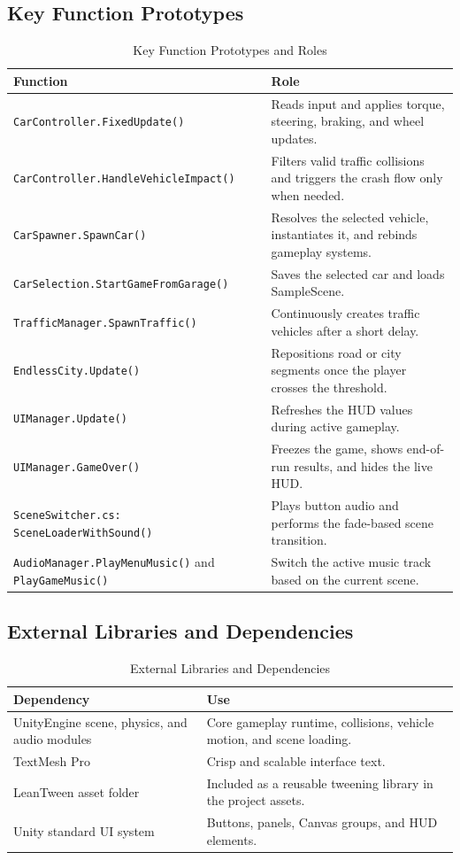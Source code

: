 \documentclass[12pt,a4paper]{article}
\begin{document}
\subsection{Key Function Prototypes}
\begin{table}[!htbp]
\centering
\caption{Key Function Prototypes and Roles}
\begin{tabularx}{\textwidth}{@{}L{4.4cm}Y@{}}
\toprule
Function & Role \\
\midrule
\texttt{CarController.FixedUpdate()} & Reads input and applies torque, steering, braking, and wheel updates. \\
\texttt{CarController.HandleVehicleImpact()} & Filters valid traffic collisions and triggers the crash flow only when needed. \\
\texttt{CarSpawner.SpawnCar()} & Resolves the selected vehicle, instantiates it, and rebinds gameplay systems. \\
\texttt{CarSelection.StartGameFromGarage()} & Saves the selected car and loads SampleScene. \\
\texttt{TrafficManager.SpawnTraffic()} & Continuously creates traffic vehicles after a short delay. \\
\texttt{EndlessCity.Update()} & Repositions road or city segments once the player crosses the threshold. \\
\texttt{UIManager.Update()} & Refreshes the HUD values during active gameplay. \\
\texttt{UIManager.GameOver()} & Freezes the game, shows end-of-run results, and hides the live HUD. \\
\texttt{SceneSwitcher.cs: SceneLoaderWithSound()} & Plays button audio and performs the fade-based scene transition. \\
\texttt{AudioManager.PlayMenuMusic()} and \texttt{PlayGameMusic()} & Switch the active music track based on the current scene. \\
\bottomrule
\end{tabularx}
\end{table}

\subsection{External Libraries and Dependencies}
\begin{table}[!htbp]
\centering
\caption{External Libraries and Dependencies}
\begin{tabularx}{\textwidth}{@{}L{4.2cm}Y@{}}
\toprule
Dependency & Use \\
\midrule
UnityEngine scene, physics, and audio modules & Core gameplay runtime, collisions, vehicle motion, and scene loading. \\
TextMesh Pro & Crisp and scalable interface text. \\
LeanTween asset folder & Included as a reusable tweening library in the project assets. \\
Unity standard UI system & Buttons, panels, Canvas groups, and HUD elements. \\
\bottomrule
\end{tabularx}
\end{table}
\end{document}
